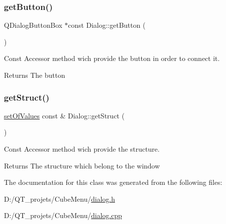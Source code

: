 \subsubsection{\texorpdfstring{get\+Button()}{getButton()}}
{\footnotesize\ttfamily Q\+Dialog\+Button\+Box $\ast$const Dialog\+::get\+Button (\begin{DoxyParamCaption}{ }\end{DoxyParamCaption})}



Const Accessor method wich provide the button in order to connect it. 

\begin{DoxyReturn}{Returns}
The button 
\end{DoxyReturn}
\hypertarget{class_dialog_a530b0b5779a9bfd94e47c271baa1af62}{}\label{class_dialog_a530b0b5779a9bfd94e47c271baa1af62} 
\subsubsection{\texorpdfstring{get\+Struct()}{getStruct()}}
{\footnotesize\ttfamily \hyperlink{structset_of_values}{set\+Of\+Values} const  \& Dialog\+::get\+Struct (\begin{DoxyParamCaption}{ }\end{DoxyParamCaption})}



Const Accessor method wich provide the structure. 

\begin{DoxyReturn}{Returns}
The structure which belong to the window 
\end{DoxyReturn}


The documentation for this class was generated from the following files\+:\begin{DoxyCompactItemize}
\item 
D\+:/\+Q\+T\+\_\+projets/\+Cube\+Menu/\hyperlink{dialog_8h}{dialog.\+h}\item 
D\+:/\+Q\+T\+\_\+projets/\+Cube\+Menu/\hyperlink{dialog_8cpp}{dialog.\+cpp}\end{DoxyCompactItemize}

